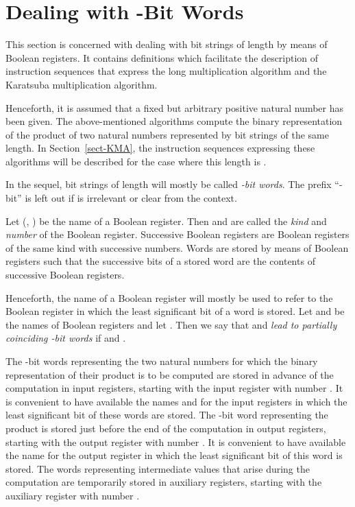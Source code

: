 \documentclass{llncs}
\begin{document}
\section{Dealing with -Bit Words}
\label{sect-words}

This section is concerned with dealing with bit strings of length  
by means of Boolean registers.
It contains definitions which facilitate the description of instruction 
sequences that express the long multiplication algorithm and the 
Karatsuba multiplication algorithm.

Henceforth, it is assumed that a fixed but arbitrary positive natural 
number  has been given.
The above-mentioned algorithms compute the binary representation of the 
product of two natural numbers represented by bit strings of the same 
length.
In Section~\ref{sect-KMA}, the instruction sequences expressing these 
algorithms will be described for the case where this length is .

In the sequel, bit strings of length  will mostly be called 
\emph{-bit words}.
The prefix ``-bit'' is left out if  is irrelevant or clear from
the context.

Let  
(, 
 ) be the name of a Boolean register.
Then  and  are called the \emph{kind} and \emph{number} of 
the Boolean register.
Successive Boolean registers are Boolean registers of the same kind with
successive numbers.
Words are stored by means of Boolean registers such that the successive 
bits of a stored word are the contents of successive Boolean registers.

Henceforth, the name of a Boolean register will mostly be used to refer 
to the Boolean register in which the least significant bit of a word is 
stored.
Let  and  be the names of Boolean registers 
and let .
Then we say that  and  \emph{lead to partially 
coinciding -bit words} if  and .

The -bit words representing the two natural numbers for which the 
binary representation of their product is to be computed are stored in 
advance of the computation in input registers, starting with the input 
register with number .
It is convenient to have available the names  and  for the 
input registers in which the least significant bit of these words are 
stored.
The -bit word representing the product is stored just before the end 
of the computation in output registers, starting with the output 
register with number . 
It is convenient to have available the name  for the output register 
in which the least significant bit of this word is stored.
The words representing intermediate values that arise during the 
computation are temporarily stored in auxiliary registers, starting with 
the auxiliary register with number .
\end{document}
